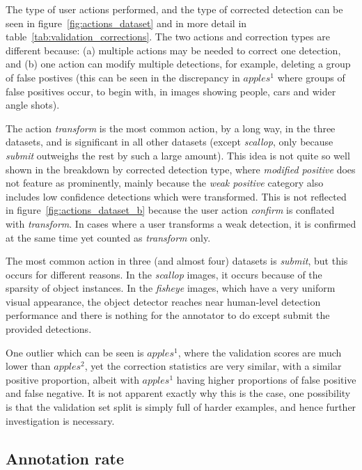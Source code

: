 The type of user actions performed, and the type of corrected detection can be seen in figure~\ref{fig:actions_dataset} and in more detail in table~\ref{tab:validation_corrections}. The two actions and correction types are different because: (a) multiple actions may be needed to correct one detection, and (b) one action can modify multiple detections, for example, deleting a group of false postives (this can be seen in the discrepancy in $apples^1$ where groups of false positives occur, to begin with, in images showing people, cars and wider angle shots). 

The action \emph{transform} is the most common action, by a long way, in the three datasets, and is significant in all other datasets (except \emph{scallop}, only because \emph{submit} outweighs the rest by such a large amount). This idea is not quite so well shown in the breakdown by corrected detection type, where \emph{modified positive} does not feature as prominently, mainly because the \emph{weak positive} category also includes low confidence detections which were transformed. This is not reflected in figure~\ref{fig:actions_dataset_b} because the user action \emph{confirm} is conflated with \emph{transform}. In cases where a user transforms a weak detection, it is confirmed at the same time yet counted as \emph{transform} only.

The most common action in three (and almost four) datasets is \emph{submit}, but this occurs for different reasons. In the \emph{scallop} images, it occurs because of the sparsity of object instances. In the \emph{fisheye} images, which have a very uniform visual appearance, the object detector reaches near human-level detection performance and there is nothing for the annotator to do except submit the provided detections.

One outlier which can be seen is $apples^1$, where the validation scores are much lower than $apples^2$, yet the correction statistics are very similar, with a similar positive proportion, albeit with $apples^1$ having higher proportions of false positive and false negative. It is not apparent exactly why this is the case, one possibility is that the validation set split is simply full of harder examples, and hence further investigation is necessary.

\subsection{Annotation rate}
\label{sec:annotation_rate}

